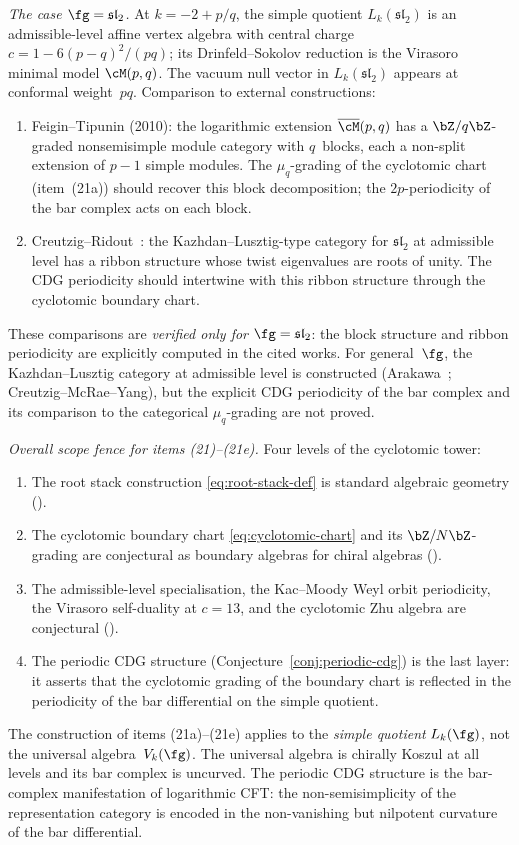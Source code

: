 \emph{The case $\fg = \mathfrak{sl}_2$.}
At $k = -2 + p/q$, the simple quotient $L_k(\mathfrak{sl}_2)$
is an admissible-level affine vertex algebra with
central charge $c = 1 - 6(p-q)^2/(pq)$;
its Drinfeld--Sokolov reduction is the
Virasoro minimal model $\cM(p,q)$.
The vacuum null vector in $L_k(\mathfrak{sl}_2)$
appears at conformal weight~$pq$.
Comparison to external constructions:
\begin{enumerate}[label=\textup{(\alph*)},nosep]
\item Feigin--Tipunin (2010): the logarithmic
 extension $\overline{\cM}(p,q)$ has a
 $\bZ/q\bZ$-graded nonsemisimple module category
 with $q$~blocks, each a non-split extension of
 $p - 1$ simple modules. The $\mu_q$-grading of the
 cyclotomic chart (item~(21a)) should recover
 this block decomposition; the $2p$-periodicity of
 the bar complex acts on each block.
\item Creutzig--Ridout~\cite{CreutzigRidout2013}: the
 Kazhdan--Lusztig-type category for $\mathfrak{sl}_2$
 at admissible level has a ribbon structure whose
 twist eigenvalues are roots of unity. The CDG
 periodicity should intertwine with this ribbon
 structure through the cyclotomic boundary chart.
\end{enumerate}
These comparisons are \emph{verified only for
$\fg = \mathfrak{sl}_2$}: the block structure and
ribbon periodicity are explicitly computed in the
cited works. For general~$\fg$, the
Kazhdan--Lusztig category at admissible level is
constructed (Arakawa~\cite{Arakawa2016RationalAdmissible};
Creutzig--McRae--Yang),
but the explicit CDG periodicity of the bar complex and
its comparison to the categorical $\mu_q$-grading are
not proved.

\emph{Overall scope fence for items
\textup{(21)--(21e)}.}
Four levels of the cyclotomic tower:
\begin{enumerate}[label=\textup{(\roman*)},nosep]
\item The root stack construction \eqref{eq:root-stack-def}
 is standard algebraic geometry
 (\ClaimStatusProvedHere).
\item The cyclotomic boundary chart
 \eqref{eq:cyclotomic-chart} and its
 $\bZ/N\bZ$-grading are conjectural as
 boundary algebras for chiral algebras
 (\ClaimStatusConjectured).
\item The admissible-level specialisation,
 the Kac--Moody Weyl orbit periodicity,
 the Virasoro self-duality at $c = 13$,
 and the cyclotomic Zhu algebra are
 conjectural (\ClaimStatusConjectured).
\item The periodic CDG structure
 (Conjecture~\ref{conj:periodic-cdg})
 is the last layer: it asserts that the
 cyclotomic grading of the boundary chart
 is reflected in the periodicity of the bar
 differential on the simple quotient.
\end{enumerate}
The construction of items \textup{(21a)--(21e)}
applies to the
\emph{simple quotient} $L_k(\fg)$, not the universal
algebra~$V_k(\fg)$.
The universal algebra is chirally Koszul at all levels
and its bar complex is uncurved.
The periodic CDG structure is the bar-complex
manifestation of logarithmic CFT: the
non-semisimplicity of the representation category is
encoded in the non-vanishing but nilpotent curvature
of the bar differential.

